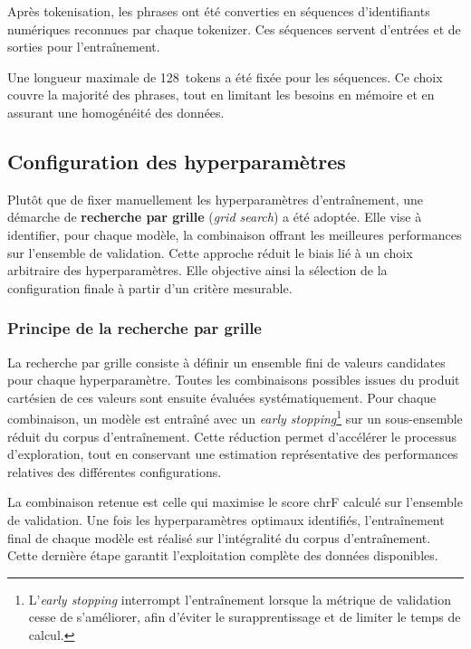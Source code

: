 Après tokenisation, les phrases ont été converties en séquences d'identifiants numériques reconnues par chaque tokenizer. Ces séquences servent d'entrées et de sorties pour l'entraînement.

Une longueur maximale de 128~tokens a été fixée pour les séquences. Ce choix couvre la majorité des phrases, tout en limitant les besoins en mémoire et en assurant une homogénéité des données.

\subsection{Configuration des hyperparamètres}
\label{subsec:hyperparametres}

Plutôt que de fixer manuellement les hyperparamètres d'entraînement, une démarche de \textbf{recherche par grille} (\textit{grid search}) a été adoptée. Elle vise à identifier, pour chaque modèle, la combinaison offrant les meilleures performances sur l'ensemble de validation. Cette approche réduit le biais lié à un choix arbitraire des hyperparamètres. Elle objective ainsi la sélection de la configuration finale à partir d'un critère mesurable.

\subsubsection{Principe de la recherche par grille}

La recherche par grille consiste à définir un ensemble fini de valeurs candidates pour chaque hyperparamètre. Toutes les combinaisons possibles issues du produit cartésien de ces valeurs sont ensuite évaluées systématiquement. Pour chaque combinaison, un modèle est entraîné avec un \textit{early stopping}\footnote{L'\textit{early stopping} interrompt l'entraînement lorsque la métrique de validation cesse de s'améliorer, afin d'éviter le surapprentissage et de limiter le temps de calcul.} sur un sous-ensemble réduit du corpus d'entraînement. Cette réduction permet d'accélérer le processus d'exploration, tout en conservant une estimation représentative des performances relatives des différentes configurations.

La combinaison retenue est celle qui maximise le score \ac{chrF} calculé sur l'ensemble de validation. Une fois les hyperparamètres optimaux identifiés, l'entraînement final de chaque modèle est réalisé sur l'intégralité du corpus d'entraînement. Cette dernière étape garantit l'exploitation complète des données disponibles.

